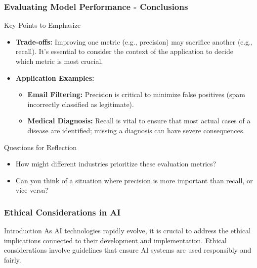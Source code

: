 \documentclass[aspectratio=169]{beamer}
\begin{document}
\begin{frame}[fragile]
    \frametitle{Evaluating Model Performance - Conclusions}
    \begin{block}{Key Points to Emphasize}
        \begin{itemize}
            \item \textbf{Trade-offs:} Improving one metric (e.g., precision) may sacrifice another (e.g., recall). It's essential to consider the context of the application to decide which metric is most crucial.
            \item \textbf{Application Examples:}
                \begin{itemize}
                    \item \textbf{Email Filtering:} Precision is critical to minimize false positives (spam incorrectly classified as legitimate).
                    \item \textbf{Medical Diagnosis:} Recall is vital to ensure that most actual cases of a disease are identified; missing a diagnosis can have severe consequences.
                \end{itemize}
        \end{itemize}
    \end{block}

    \begin{block}{Questions for Reflection}
        \begin{itemize}
            \item How might different industries prioritize these evaluation metrics?
            \item Can you think of a situation where precision is more important than recall, or vice versa?
        \end{itemize}
    \end{block}
\end{frame}

\begin{frame}[fragile]
    \frametitle{Ethical Considerations in AI}
    \begin{block}{Introduction}
        As AI technologies rapidly evolve, it is crucial to address the ethical implications connected to their development and implementation. Ethical considerations involve guidelines that ensure AI systems are used responsibly and fairly.
    \end{block}
\end{frame}
\end{document}

